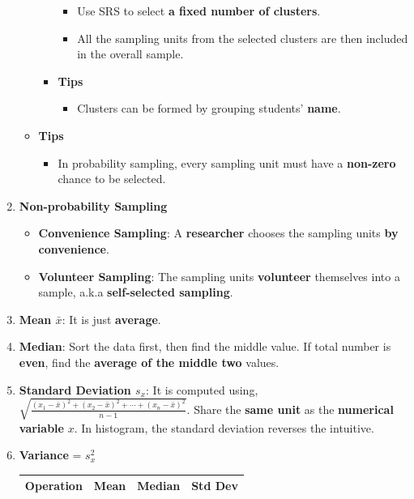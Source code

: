 \documentclass[10pt, landscape]{article}
\begin{document}
\begin{multicols}{4}
\begin{enumerate}
\begin{itemize}
\begin{itemize}
\begin{itemize}
                \item Use SRS to select \textbf{a fixed number of clusters}.
                \item All the sampling units from the selected clusters are then included in the overall sample.
            \end{itemize}
            \item \textbf{Tips}
            \begin{itemize}
                \item Clusters can be formed by grouping students' \textbf{name}.
            \end{itemize}
        \end{itemize}
        \item \textbf{Tips}
        \begin{itemize}
            \item In probability sampling, every sampling unit must have a \textbf{non-zero} chance to be selected.
        \end{itemize}
    \end{itemize}
    \item \textbf{Non-probability Sampling}
    \begin{itemize}
        \item \textbf{Convenience Sampling}: A \textbf{researcher }chooses the sampling units \textbf{by convenience}.
        \item \textbf{Volunteer Sampling}: The sampling units \textbf{volunteer} themselves into a sample, a.k.a \textbf{self-selected sampling}.
    \end{itemize}
    \item \textbf{Mean $\bar{x}$}: It is just \textbf{average}.
    \item \textbf{Median}: Sort the data first, then find the middle value. If total number is \textbf{even}, find the \textbf{average of the middle two} values.
    \item \textbf{Standard Deviation $s_x$}: It is computed using, $\sqrt{\frac{(x_1-\bar{x})^2+(x_2-\bar{x})^2+\cdots+(x_n-\bar{x})^2}{n-1}}$. Share the \textbf{same unit} as the \textbf{numerical variable} $x$. In histogram, the standard deviation reverses the intuitive.
    \item \textbf{Variance} = $s_x^2$ \\
    \begin{tabular}{|c|c|c|c|}
        \hline
        Operation & Mean & Median & Std Dev \\ \hline

\end{tabular}
\end{enumerate}
\end{multicols}
\end{document}
